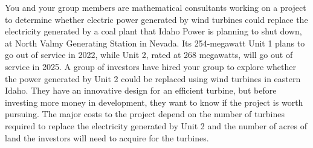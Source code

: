 \documentclass[11pt]{article}
\begin{document}
\begin{minipage}[t][2.6in]{0.65\textwidth}
    \vspace{0pt}

    You and your group members are mathematical consultants working on a
    project to determine whether electric power generated by wind turbines
    could replace the electricity generated by a coal plant that Idaho Power
    is planning to shut down, at North Valmy Generating Station in Nevada. Its
    254-megawatt Unit 1 plans to go
    out of service in 2022, while Unit 2, rated at 268 megawatts, will go out of
    service in 2025. A group of investors have hired your group to explore
    whether the power generated by Unit 2 could be replaced using
    wind turbines in eastern Idaho. They have an innovative design for an
    efficient turbine, but before investing more money in development, they
    want to know if the project is worth pursuing. The major costs to the
    project depend on the number of turbines required to replace the
    electricity generated by Unit 2 and the number of acres of land
    the investors will need to acquire for the turbines.




    \end{minipage} \hspace{1em}
\end{document}
